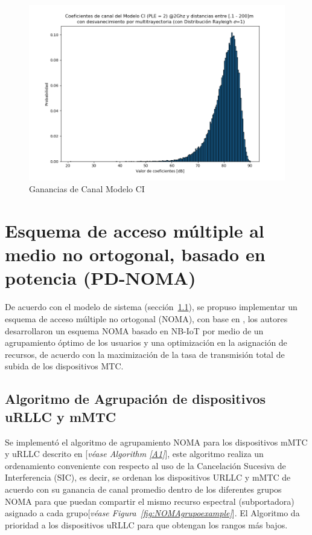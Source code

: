 \begin{figure}[th]
    \centering
    \includegraphics[scale=.55]{Figures/CoeficientesCanalCI.png}
    \decoRule
    \caption[Ganancias de Canal Modelo CI]{Ganancias de Canal Modelo CI}
    \label{fig:GananciasCI_C6}
\end{figure}

\hfill

\break

\section{Esquema de acceso múltiple al medio no ortogonal, basado en potencia (PD-NOMA)}

De acuerdo con el modelo de sistema (sección~\ref{}), se propuso implementar un esquema de acceso múltiple no ortogonal (NOMA), con base en \parencite{Shahini2019}, los autores desarrollaron un esquema NOMA basado en NB-IoT por medio de un agrupamiento óptimo de los usuarios y una optimización en la asignación de recursos, de acuerdo con la maximización de la tasa de transmisión total de subida de los dispositivos MTC.\newline

\subsection{Algoritmo de Agrupación de dispositivos uRLLC  y mMTC}

Se implementó el algoritmo de agrupamiento NOMA para los dispositivos mMTC y uRLLC descrito en \parencite{Shahini2019}[\textit{véase Algorithm \ref{A1}}], este algoritmo realiza un ordenamiento conveniente con respecto al uso de la Cancelación Sucesiva de Interferencia (SIC), es decir, se ordenan los dispositivos URLLC y mMTC de acuerdo con su ganancia de canal promedio dentro de los diferentes grupos NOMA para que puedan compartir el mismo recurso espectral (subportadora) asignado a cada grupo[\textit{véase Figura~\ref{fig:NOMAgrupoexample}}]. El Algoritmo da prioridad a los dispositivos uRLLC para que obtengan los rangos más bajos. \newline

